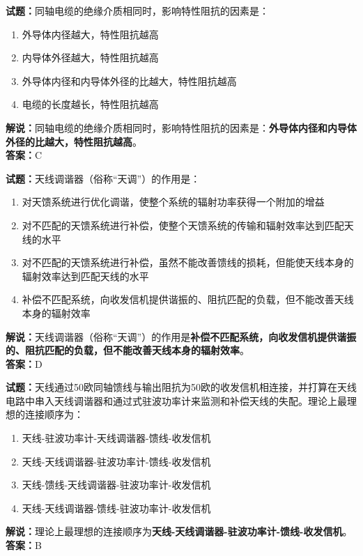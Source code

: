 \documentclass{ctexbook}
\begin{document}
\bigskip


\noindent\textbf{试题：}同轴电缆的绝缘介质相同时，影响特性阻抗的因素是：
\begin{enumerate}[leftmargin=3em]
\item 外导体内径越大，特性阻抗越高
\item 内导体外径越大，特性阻抗越高
\item 外导体内径和内导体外径的比越大，特性阻抗越高
\item 电缆的长度越长，特性阻抗越高
\end{enumerate}
\noindent\textbf{解说：}同轴电缆的绝缘介质相同时，影响特性阻抗的因素是：\textbf{外导体内径和内导体外径的比越大，特性阻抗越高}。\\\noindent\textbf{答案：}C



\bigskip


\noindent\textbf{试题：}天线调谐器（俗称“天调”）的作用是：
\begin{enumerate}[leftmargin=3em]
\item 对天馈系统进行优化调谐，使整个系统的辐射功率获得一个附加的增益
\item 对不匹配的天馈系统进行补偿，使整个天馈系统的传输和辐射效率达到匹配天线的水平
\item 对不匹配的天馈系统进行补偿，虽然不能改善馈线的损耗，但能使天线本身的辐射效率达到匹配天线的水平
\item 补偿不匹配系统，向收发信机提供谐振的、阻抗匹配的负载，但不能改善天线本身的辐射效率
\end{enumerate}
\noindent\textbf{解说：}天线调谐器（俗称“天调”）的作用是\textbf{补偿不匹配系统，向收发信机提供谐振的、阻抗匹配的负载，但不能改善天线本身的辐射效率}。\\\noindent\textbf{答案：}D



\bigskip


\noindent\textbf{试题：}天线通过50欧同轴馈线与输出阻抗为50欧的收发信机相连接，并打算在天线电路中串入天线调谐器和通过式驻波功率计来监测和补偿天线的失配。理论上最理想的连接顺序为：
\begin{enumerate}[leftmargin=3em]
\item 天线-驻波功率计-天线调谐器-馈线-收发信机
\item 天线-天线调谐器-驻波功率计-馈线-收发信机
\item 天线-馈线-天线调谐器-驻波功率计-收发信机
\item 天线-天线调谐器-馈线-驻波功率计-收发信机
\end{enumerate}
\noindent\textbf{解说：}理论上最理想的连接顺序为\textbf{天线-天线调谐器-驻波功率计-馈线-收发信机}。\\\noindent\textbf{答案：}B
\end{document}
